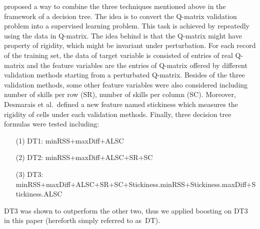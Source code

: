 \documentclass{edm_template}
\begin{document}
  proposed a way to combine the three techniques mentioned above in the framework of a decision tree. The idea is to convert the Q-matrix validation problem into a supervised learning problem. This task is achieved by repeatedly using the data in Q-matrix. The idea behind is that the Q-matrix might have property of rigidity, which might be invariant under perturbation. For each record of the training set, the data of target variable is consisted of entries of real Q-matrix and the feature variables are the entries of Q-matrix offered by different validation methods starting from a perturbated Q-matrix. Besides of the three validation methods, some other feature variables were also considered including number of skills per row (SR), number of skills per column (SC). Moreover, Desmarais et al.\ defined a new feature named stickiness which measures the rigidity of cells under each validation methods. Finally, three decision tree formulas were tested including:
\begin{itemize}\raggedright
\item[(1)] DT1: minRSS+maxDiff+ALSC
\item[(2)] DT2: minRSS+maxDiff+ALSC+SR+SC
\item[(3)] DT3: minRSS+maxDiff+ALSC+SR+SC+\linebreak Stickiness.minRSS+Stickiness.maxDiff+\linebreak Stickiness.ALSC
\end{itemize}
DT3 was shown to outperform the other two, thus we applied boosting on DT3 in this paper (hereforth simply referred to as~DT).

\end{document}
